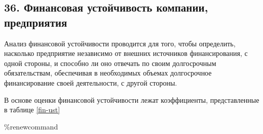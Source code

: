 \subsection*{36. Финансовая устойчивость компании, предприятия}

Анализ финансовой устойчивости проводится для того, чтобы определить, насколько предприятие независимо от внешних источников финансирования, с одной стороны, и способно ли оно отвечать по своим долгосрочным обязательствам, обеспечивая в необходимых объемах долгосрочное финансирование своей деятельности, с другой стороны.

В основе оценки финансовой устойчивости лежат коэффициенты, представленные в таблице \ref{fin-ust}

\begingroup
\setlength{\extrarowheight}{0.5cm}
	\small
	\%renewcommand
